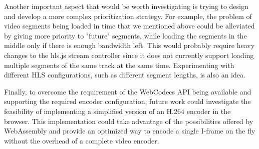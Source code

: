 Another important aspect that would be worth investigating is trying to design and develop a more complex prioritization strategy. For example, the problem of video segments being loaded in time that we mentioned above could be alleviated by giving more priority to "future" segments, while loading the segments in the middle only if there is enough bandwidth left. This would probably require heavy changes to the hls.js stream controller since it does not currently support loading multiple segments of the same track at the same time. Experimenting with different HLS configurations, such as different segment lengths, is also an idea.

Finally, to overcome the requirement of the WebCodecs API being available and supporting the required encoder configuration, future work could investigate the feasibility of implementing a simplified version of an H.264 encoder in the browser. This implementation could take advantage of the possibilities offered by WebAssembly and provide an optimized way to encode a single I-frame on the fly without the overhead of a complete video encoder.


